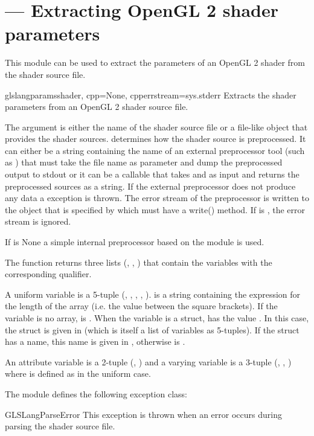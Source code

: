 \section{ ---
          Extracting OpenGL 2 shader parameters}
\label{slparams}


This module can be used to extract the parameters of an OpenGL 2 shader
from the shader source file.

\begin{funcdesc}{glslangparams}{shader, cpp=None, cpperrstream=sys.stderr}
Extracts the shader parameters from an OpenGL 2 shader source file.

The argument  is either the name of the shader source file or a
file-like object that provides the shader sources.  determines how
the shader source is preprocessed. It can either be a string
containing the name of an external preprocessor tool (such as )
that must take the file name as parameter and dump the preprocessed
output to stdout or it can be a callable that takes  and
 as input and returns the preprocessed sources as a
string. If the external preprocessor does not produce any data a
 exception is thrown.  The error stream of the
preprocessor is written to the object that is specified by
 which must have a write() method. If  is
, the error stream is ignored.

If  is None a simple internal preprocessor based on the 
 module is used.

The function returns three lists (, , 
) that contain the variables with the corresponding qualifier.

A uniform variable is a 5-tuple (, , ,
, ).  is a string containing 
the expression for the length of the array (i.e. the value between the
square brackets). If the variable is no array,  is
.  When the variable is a struct,  has the value
. In this case, the struct is given in  (which is
itself a list of variables as 5-tuples). If the struct has a name,
this name is given in , otherwise  is 
.

An attribute variable is a 2-tuple (, ) and a 
varying variable is a 3-tuple (, , ) 
where  is defined as in the uniform case.
\end{funcdesc}

The module defines the following exception class:

\begin{excdesc}{GLSLangParseError}
This exception is thrown when an error occurs during parsing the shader
source file.
\end{excdesc}
